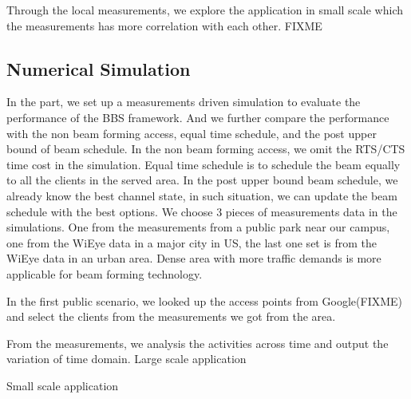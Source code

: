 Through the local measurements, we explore the application in small scale which the measurements has more 
correlation with each other.
FIXME

\subsection{Numerical Simulation}
\label{subsec:result}

In the part, we set up a measurements driven simulation to evaluate the performance of the BBS framework.
And we further compare the performance with the non beam forming access, equal time schedule, and the post 
upper bound of beam schedule. In the non beam forming access, we omit the RTS/CTS time cost in the simulation.
Equal time schedule is to schedule the beam equally to all the clients in the served area. In the post upper
bound beam schedule, we already know the best channel state, in such situation, we can update the beam schedule
with the best options.
We choose 3 pieces of measurements data in the simulations. One from the measurements from a public park near
our campus, one from the WiEye data in a major city in US, the last one set is from the WiEye data in an 
urban area. Dense area with more traffic demands is more applicable for beam forming technology.

In the first public scenario, we looked up the access points from Google(FIXME) and select the clients from the 
measurements we got from the area.


From the measurements, we analysis the activities across time and output the variation of time domain.
Large scale application

Small scale application


















